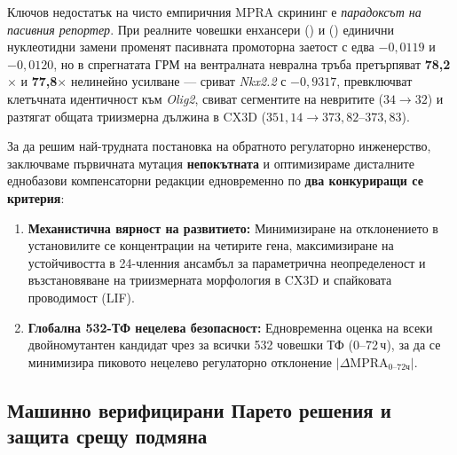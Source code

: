 \documentclass[10.5pt,a4paper]{article}
\begin{document}
Ключов недостатък на чисто емпиричния MPRA скрининг е \emph{парадоксът на пасивния репортер}. При реалните човешки енхансери  () и  () единични нуклеотидни замени променят пасивната промоторна заетост с едва $-0{,}0119$ и $-0{,}0120$, но в спрегнатата ГРМ на вентралната неврална тръба претърпяват \textbf{78,2$\times$} и \textbf{77,8$\times$} нелинейно усилване — сриват \emph{Nkx2.2} с $-0{,}9317$, превключват клетъчната идентичност към \emph{Olig2}, свиват сегментите на невритите ($34\to 32$) и разтягат общата триизмерна дължина в CX3D ($351{,}14\to 373{,}82$--$373{,}83$).

За да решим най-трудната постановка на обратното регулаторно инженерство, заключваме първичната мутация \textbf{непокътната} и оптимизираме дисталните еднобазови компенсаторни редакции едновременно по \textbf{два конкуриращи се критерия}:
\begin{enumerate}
\item \textbf{Механистична вярност на развитието:} Минимизиране на отклонението в установилите се концентрации на четирите гена, максимизиране на устойчивостта в 24-членния ансамбъл за параметрична неопределеност и възстановяване на триизмерната морфология в CX3D и спайковата проводимост (LIF).
\item \textbf{Глобална 532-ТФ нецелева безопасност:} Едновременна оценка на всеки двойномутантен кандидат чрез  за всички 532 човешки ТФ (0--72\,ч), за да се минимизира пиковото нецелево регулаторно отклонение $|\Delta\text{MPRA}_{0\text{--}72\text{ч}}|$.
\end{enumerate}

\subsection{Машинно верифицирани Парето решения и защита срещу подмяна}
\end{document}
